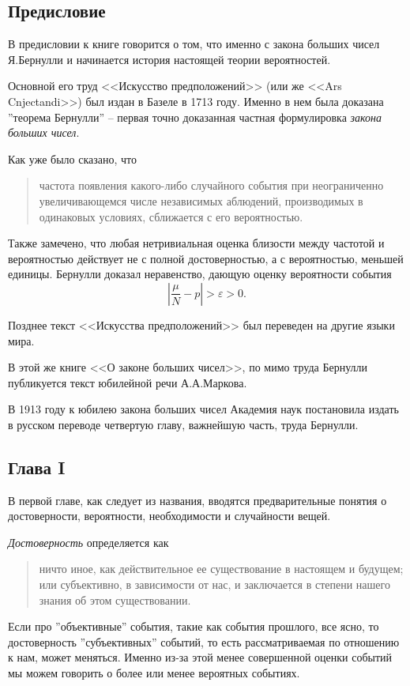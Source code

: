 \documentclass[12pt]{article}
\begin{document}
\subsection*{Предисловие}
В предисловии к книге говорится о том, что именно с закона больших чисел Я.Бернулли и начинается история настоящей теории вероятностей.

Основной его труд <<Искусство предположений>> (или же <<Ars Cnjectandi>>) был издан в Базеле в 1713 году.
Именно в нем была доказана ''теорема Бернулли'' -- первая точно доказанная частная формулировка \textit{закона больших чисел}.

Как уже было сказано, что 
\begin{quote}
	частота появления какого-либо случайного события при неограниченно увеличивающемся числе независимых аблюдений, производимых в одинаковых условиях, сближается с его вероятностью.
\end{quote}
Также замечено, что любая нетривиальная оценка близости между частотой и вероятностью действует не с полной достоверностью, а с вероятностью, меньшей единицы.
Бернулли доказал неравенство, дающую оценку вероятности события
$$\left| \frac{\mu}{N} - p \right| > \varepsilon > 0.$$

Позднее текст <<Искусства предположений>> был переведен на другие языки мира.

В этой же книге <<О законе больших чисел>>, по мимо труда Бернулли публикуется текст юбилейной речи А.А.Маркова.

В 1913 году к юбилею закона больших чисел Академия наук постановила издать в русском переводе четвертую главу, важнейшую часть, труда Бернулли.

\newpage
\subsection{Глава I}
В первой главе, как следует из названия, вводятся предварительные понятия о достоверности, вероятности, необходимости и случайности вещей.

\textit{Достоверность} определяется как 
\begin{quote}
ничто иное, как действительное ее существование в настоящем и будущем; или субъективно, в зависимости от нас, и заключается в степени нашего знания об этом существовании.
\end{quote}
Если про ''объективные'' события, такие как события прошлого, все ясно, то достоверность ''субъективных'' событий, то есть рассматриваемая по отношению к нам, может меняться.
Именно из-за этой менее совершенной оценки событий мы можем говорить о более или менее вероятных событиях.
\end{document}

